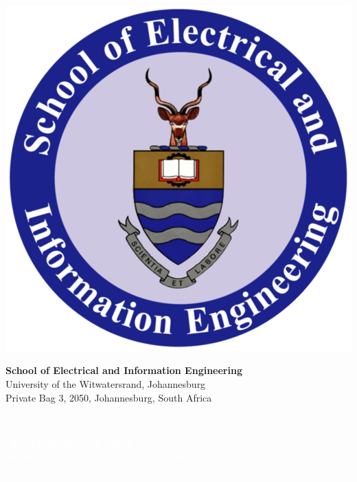\documentclass[11pt]{article}
\begin{document}
\pagestyle{empty}
\begin{minipage}{0.18\textwidth}
    \includegraphics[width=\textwidth,height=\textwidth]{eie.png}
\end{minipage}
\begin{minipage}{0.8\textwidth}
    \centering
    \textbf{\Large School of Electrical and Information Engineering}\\
    {\large University of the Witwatersrand, Johannesburg}\\
    {\small Private Bag 3, 2050, Johannesburg, South Africa}\\
\end{minipage}
\vspace{.3cm}\\
\colorbox{myblue}{\begin{minipage}{0.98\textwidth}
        \begin{center}
            \textcolor{white}{\textbf{\Large{ELEN4017: Project - 2017}}\\
                \textbf{Networks:  Email Application System}\\
                May 2017
            }
        \end{center}
    \end{minipage}
}
\\
\vspace{6cm}
\end{document}
